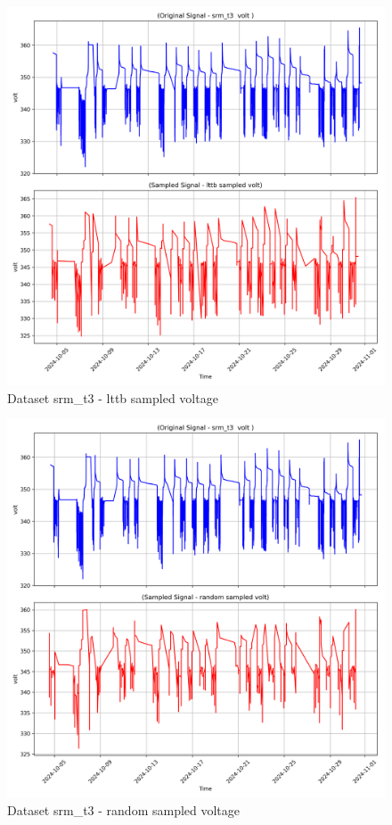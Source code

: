 \begin{figure}
    \centering
    \includegraphics[width=1\linewidth]{screenshots/srm_t3/lttb_sampled_volt_screenshot.png}
    \caption{Dataset srm\_t3 - lttb sampled voltage }
    \label{fig:srm_t3_lttb_sampled_volt_screenshot}
\end{figure}
\begin{figure}
    \centering
    \includegraphics[width=1\linewidth]{screenshots/srm_t3/random_sampled_volt_screenshot.png}
    \caption{Dataset srm\_t3 - random sampled voltage }
    \label{fig:srm_t3_random_sampled_volt_screenshot}
\end{figure}

